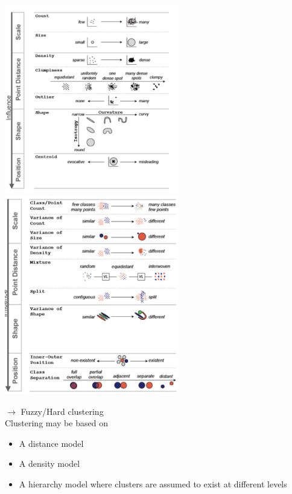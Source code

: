 \documentclass[11pt,ngerman]{article}
\begin{document}
\includegraphics[width=3in]{images/Selection_003.png}
\includegraphics[width=3in]{images/Selection_004.png}

$\rightarrow$ Fuzzy/Hard clustering\\

Clustering may be based on
\begin{itemize}
	\item A distance model
	\item A density model
	\item A hierarchy model where clusters are assumed to
exist at different levels
\end{itemize}
\end{document}

